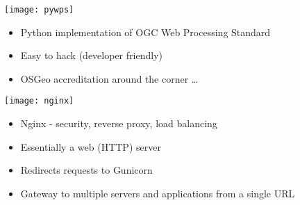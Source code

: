 \documentclass[portrait,a0paper,fontscale=0.4]{baposter} %
\newcommand{\compresslist}{%
\setlength{\itemsep}{1pt}%
\setlength{\parskip}{0pt}%
\setlength{\parsep}{0pt}%
}
\begin{document}
\begin{poster}
{\begin{multicols}{2}
\begin{minipage}{0.5\textwidth}
    \begin{minipage}{0.15\textwidth}
      \texttt{[image: pywps]}
    \end{minipage}
    \begin{minipage}{0.85\textwidth}
      \begin{itemize}\compresslist
        \item Python implementation of OGC Web Processing Standard
        \item Easy to hack (developer friendly)
        \item OSGeo accreditation around the corner \ldots
      \end{itemize}
    \end{minipage}

    \begin{minipage}{0.15\textwidth}
      \texttt{[image: nginx]}
    \end{minipage}
    \begin{minipage}{0.85\textwidth}
      \begin{itemize}\compresslist
        \item Nginx - security, reverse proxy, load balancing
        \item Essentially a web (HTTP) server
        \item Redirects requests to Gunicorn
        \item Gateway to multiple servers and applications from a single URL
      \end{itemize}
    \end{minipage}


\end{minipage}
\end{multicols}}
\end{poster}
\end{document}
